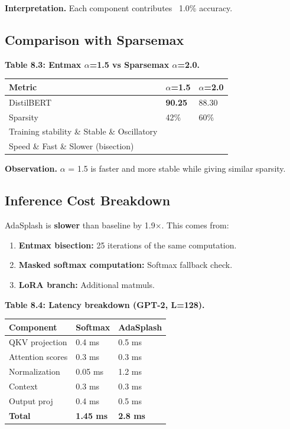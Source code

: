 \textbf{Interpretation.} Each component contributes ~1.0\% accuracy.

\subsection{Comparison with Sparsemax}

\textbf{Table 8.3: Entmax $\alpha$=1.5 vs Sparsemax $\alpha$=2.0.}

\begin{table}[H]
\centering
\small
\begin{tabular}{lll}
\toprule
\textbf{Metric} & \textbf{$\alpha$=1.5} & \textbf{$\alpha$=2.0} \\
\midrule
DistilBERT & \textbf{90.25} & 88.30 \\
Sparsity & 42\% & 60\% \\
Training stability \& Stable \& Oscillatory \\
Speed \& Fast \& Slower (bisection) \\
\bottomrule
\end{tabular}
\end{table}

\textbf{Observation.} $\alpha$ = 1.5 is faster and more stable while giving similar 
sparsity.

\subsection{Inference Cost Breakdown}

AdaSplash is \textbf{slower} than baseline by 1.9$\times$. This comes from:

\begin{enumerate}
\item \textbf{Entmax bisection:} 25 iterations of the same computation.
\item \textbf{Masked softmax computation:} Softmax fallback check.
\item \textbf{LoRA branch:} Additional matmuls.

\end{enumerate}
\textbf{Table 8.4: Latency breakdown (GPT-2, L=128).}

\begin{table}[H]
\centering
\small
\begin{tabular}{lll}
\toprule
\textbf{Component} & \textbf{Softmax} & \textbf{AdaSplash} \\
\midrule
QKV projection & 0.4 ms & 0.5 ms \\
Attention scores & 0.3 ms & 0.3 ms \\
Normalization & 0.05 ms & 1.2 ms \\
Context & 0.3 ms & 0.3 ms \\
Output proj & 0.4 ms & 0.5 ms \\
\textbf{Total} & \textbf{1.45 ms} & \textbf{2.8 ms} \\
\bottomrule
\end{tabular}
\end{table}

